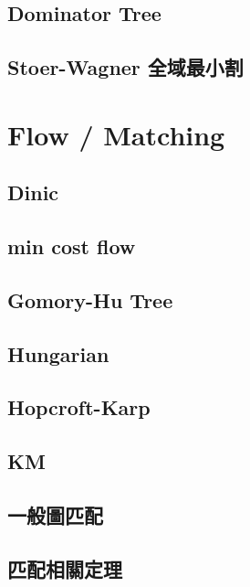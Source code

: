 \subsection{Dominator Tree}

\subsection{Stoer-Wagner 全域最小割}


\section{Flow / Matching}

\subsection{Dinic}

\subsection{min cost flow}

\subsection{Gomory-Hu Tree}

\subsection{Hungarian}

\subsection{Hopcroft-Karp}

\subsection{KM}

\subsection{一般圖匹配}

\subsection{匹配相關定理}


